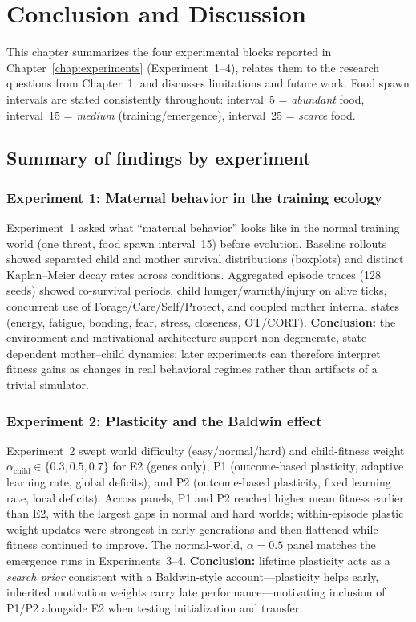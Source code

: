 \newpage
\chapter{Conclusion and Discussion}
\label{chap:conclusion}

This chapter summarizes the four experimental blocks reported in Chapter~\ref{chap:experiments} (Experiment~1--4), relates them to the research questions from Chapter~1, and discusses limitations and future work.
Food spawn intervals are stated consistently throughout: interval~5 = \emph{abundant} food, interval~15 = \emph{medium} (training/emergence), interval~25 = \emph{scarce} food.

\section{Summary of findings by experiment}

\subsection{Experiment 1: Maternal behavior in the training ecology}
Experiment~1 asked what ``maternal behavior'' looks like in the normal training world (one threat, food spawn interval~15) before evolution.
Baseline rollouts showed separated child and mother survival distributions (boxplots) and distinct Kaplan--Meier decay rates across conditions.
Aggregated episode traces (128 seeds) showed co-survival periods, child hunger/warmth/injury on alive ticks, concurrent use of Forage/Care/Self/Protect, and coupled mother internal states (energy, fatigue, bonding, fear, stress, closeness, OT/CORT).
\textbf{Conclusion:} the environment and motivational architecture support non-degenerate, state-dependent mother--child dynamics; later experiments can therefore interpret fitness gains as changes in real behavioral regimes rather than artifacts of a trivial simulator.

\subsection{Experiment 2: Plasticity and the Baldwin effect}
Experiment~2 swept world difficulty (easy/normal/hard) and child-fitness weight $\alpha_{\text{child}}\in\{0.3,0.5,0.7\}$ for E2 (genes only), P1 (outcome-based plasticity, adaptive learning rate, global deficits), and P2 (outcome-based plasticity, fixed learning rate, local deficits).
Across panels, P1 and P2 reached higher mean fitness earlier than E2, with the largest gaps in normal and hard worlds; within-episode plastic weight updates were strongest in early generations and then flattened while fitness continued to improve.
The normal-world, $\alpha=0.5$ panel matches the emergence runs in Experiments~3--4.
\textbf{Conclusion:} lifetime plasticity acts as a \emph{search prior} consistent with a Baldwin-style account---plasticity helps early, inherited motivation weights carry late performance---motivating inclusion of P1/P2 alongside E2 when testing initialization and transfer.

